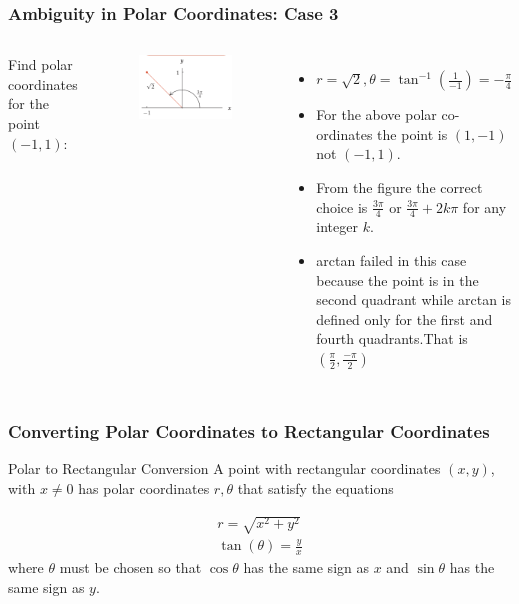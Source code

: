 \documentclass{beamer}
\begin{document}
\begin{frame}
\frametitle{Ambiguity in Polar Coordinates: Case 3}
\begin{columns}
    Find polar coordinates for the point \((-1, 1)\):
        \begin{figure}
        \centering
        \includegraphics[width=\textwidth]{polar5.png}
        \end{figure}
    \begin{itemize}
        \item \(r = \sqrt{2}, \theta = \tan^{-1} \left(\frac{1}{-1}\right) = -\frac{\pi}{4}\)
        \item For the above polar co-ordinates the point is \((1,-1)\) not \((-1, 1)\).
        \item From the figure the correct choice is \(\frac{3\pi}{4}\) or \(\frac{3\pi}{4} + 2k\pi\) for any integer \( k \).
        \item arctan failed in this case because the point is in the second quadrant while arctan is defined only for the first and fourth quadrants.That is \((\frac{\pi}{2},\frac{-\pi}{2})\)
    \end{itemize}
\end{columns}
\end{frame}

\begin{frame}
\frametitle{Converting Polar Coordinates to Rectangular Coordinates}
\begin{block}{Polar to Rectangular Conversion}
   A point with rectangular coordinates \((x, y)\), with \(x \neq 0\) has polar coordinates \(r,\theta\) that satisfy the equations 

   \begin{align*}
   r = \sqrt{x^2 + y^2} \\
   \tan(\theta) = \frac{y}{x}
   \end{align*}
   where \(\theta\) must be chosen so that \(\cos \theta \) has the same sign as \(x\) and \(\sin \theta\) has the same sign as \(y\).
\end{block}

\end{frame}
\end{document}
